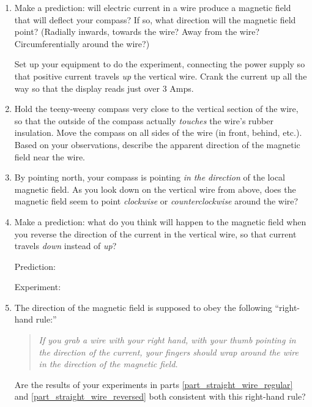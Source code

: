 \begin{enumerate}[labparts]

\item Make a prediction: will electric current in a wire produce a magnetic field that will deflect your compass?  If so, what direction will the magnetic field point?  (Radially inwards, towards the wire?  Away from the wire?  Circumferentially around the wire?)
\answerspace{0.5 in}

Set up your equipment to do the experiment, connecting the power supply so that positive current travels \textit{up} the vertical wire.  Crank the current up all the way so that the display reads just over 3 Amps.  

\item Hold the teeny-weeny compass very close to the vertical section of the wire, so that the outside of the compass  actually \textit{touches} the wire's rubber insulation.  Move the compass on all sides of the wire (in front, behind, etc.).  Based on your observations, describe the apparent direction of the magnetic field near the wire. \label{part_straight_wire_regular}
\answerspace{0.5 in}

\item By pointing north, your compass is pointing \textit{in the direction} of the local magnetic field.  As you look down on the vertical wire from above, does the magnetic field seem to point \textit{clockwise} or \textit{counterclockwise} around the wire? 
\answerspace{0.3 in}

\item Make a prediction: what do you think will happen to the magnetic field when you reverse the direction of the current in the vertical wire, so that current travels \textit{down} instead of \textit{up}? \label{part_straight_wire_reversed}

\bigskip
\hspace{0.5in} Prediction:

\bigskip
\hspace{0.5in} Experiment:
\bigskip

\item The direction of the magnetic field is supposed to obey the following ``right-hand rule:''
\begin{quote}\textit{If you grab a wire with your right hand, with your thumb pointing in the direction of the current, your fingers should wrap around the wire in the direction of the magnetic field.}
\end{quote}
Are the results of your experiments in parts \ref{part_straight_wire_regular} and \ref{part_straight_wire_reversed} both consistent with this right-hand rule?
\answerspace{0.3 in}

\end{enumerate}


